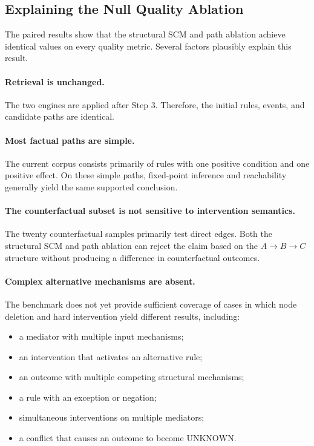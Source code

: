 \subsection{Explaining the Null Quality Ablation}

The paired results show that the structural SCM and path ablation achieve
identical values on every quality metric. Several factors plausibly explain
this result.

\paragraph{Retrieval is unchanged.}

The two engines are applied after Step 3. Therefore, the initial rules,
events, and candidate paths are identical.

\paragraph{Most factual paths are simple.}

The current corpus consists primarily of rules with one positive condition
and one positive effect. On these simple paths, fixed-point inference and
reachability generally yield the same supported conclusion.

\paragraph{The counterfactual subset is not sensitive to intervention
semantics.}

The twenty counterfactual samples primarily test direct edges. Both the
structural SCM and path ablation can reject the claim based on the
\(A \rightarrow B \rightarrow C\) structure without producing a difference
in counterfactual outcomes.

\paragraph{Complex alternative mechanisms are absent.}

The benchmark does not yet provide sufficient coverage of cases in which
node deletion and hard intervention yield different results, including:

\begin{itemize}
    \item a mediator with multiple input mechanisms;
    \item an intervention that activates an alternative rule;
    \item an outcome with multiple competing structural mechanisms;
    \item a rule with an exception or negation;
    \item simultaneous interventions on multiple mediators;
    \item a conflict that causes an outcome to become
    \(\mathrm{UNKNOWN}\).
\end{itemize}

